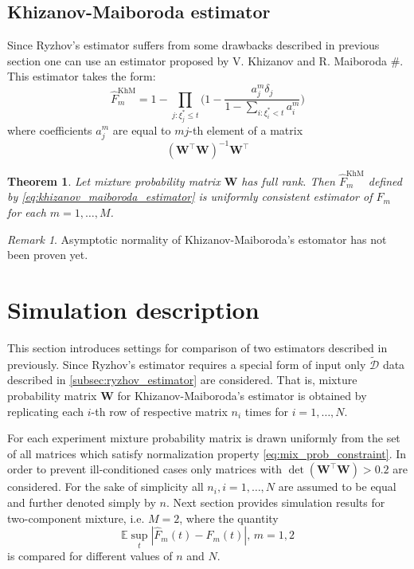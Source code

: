 \documentclass[12pt,reqno,a4paper,oneside,draft]{article}
\theoremstyle{plain}
\newtheorem{thm}{Theorem}[section]
\theoremstyle{definition}
\theoremstyle{remark}
\newtheorem*{rem}{Remark}
\begin{document}
\subsection{Khizanov-Maiboroda estimator}
Since Ryzhov's estimator suffers from some drawbacks described in previous section one can use an estimator proposed by V. Khizanov and R. Maiboroda $\#$. This estimator takes the form:
\begin{equation}
\label{eq:khizanov_maiboroda_estimator}
\hat F^{\mathrm{KhM}}_m = 1 - \prod _{j : \xi ^*_j \leq t}\bigg( 1 - \frac {a_j^m \delta _j}{1 - \sum _{i:\xi ^*_i < t} a_i^m} \bigg)
\end{equation}
where coefficients $a_j^m$ are equal to $mj$-th element of a matrix
\begin{equation}
(\mathbf W^\top \mathbf W)^{-1}\mathbf W^\top
\end{equation}
\begin{thm}
Let mixture probability matrix $\mathbf W$ has full rank. Then $\hat F^{\mathrm{KhM}}_m$ defined by \eqref{eq:khizanov_maiboroda_estimator} is uniformly consistent estimator of $F_m$ for each $m=1,\ldots, M$.
\end{thm}
\begin{rem}
Asymptotic normality of Khizanov-Maiboroda's estomator has not been proven yet.
\end{rem}



\section{Simulation description}
\label{sec:Simulation_description}
This section introduces settings for comparison of two estimators described in previously. Since Ryzhov's estimator requires a special form of input  only $\tilde{\mathcal D}$ data described in \ref{subsec:ryzhov_estimator} are considered. That is, mixture probability matrix $\mathbf W$ for Khizanov-Maiboroda's estimator is obtained by replicating each $i$-th row of respective matrix $n_i$ times for $i=1,\ldots, N$.

For each experiment mixture probability matrix is drawn uniformly from the set of all matrices which satisfy normalization property \eqref{eq:mix_prob_constraint}. In order to prevent ill-conditioned cases only matrices with $\det (\mathbf W^\top \mathbf W) > 0.2$ are considered. For the sake of simplicity all $n_i,i = 1,\ldots, N$ are assumed to be equal and further denoted simply by $n$. Next section provides simulation results for two-component mixture, i.e. $M=2$, where the quantity
\begin{equation}
\mathbb E \sup _{t} |\hat F_m(t) - F_m(t)|, \, m=1,2
\end{equation}
is compared for different values of $n$ and $N$.
\end{document}
